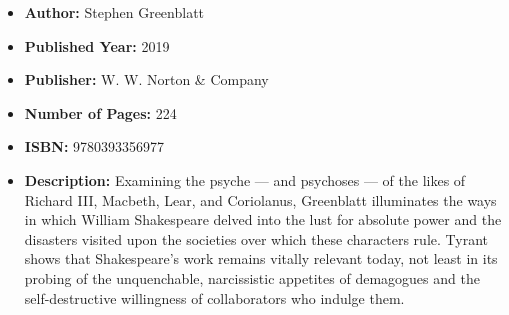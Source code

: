 \documentclass{tufte-handout}
\begin{document}
\begin{itemize}
    \item[] \textbf{Author:} Stephen Greenblatt 
    \item[] \textbf{Published Year:} 2019
    \item[] \textbf{Publisher:} W. W. Norton \& Company
    \item[] \textbf{Number of Pages:} 224    
    \item[] \textbf{ISBN:} 9780393356977
    \item[] \textbf{Description:} Examining the psyche --- and psychoses --- of the likes of Richard III, Macbeth, Lear, and Coriolanus, Greenblatt illuminates the ways in which William Shakespeare delved into the lust for absolute power and the disasters visited upon the societies over which these characters rule. Tyrant shows that Shakespeare’s work remains vitally relevant today, not least in its probing of the unquenchable, narcissistic appetites of demagogues and the self-destructive willingness of collaborators who indulge them.
\end{itemize}
\end{document}
